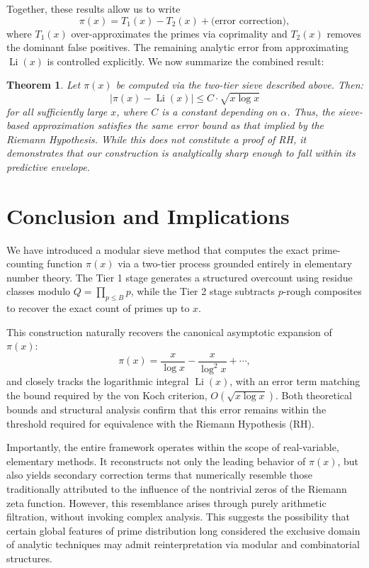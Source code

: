 \documentclass[11pt]{article}
\newtheorem{theorem}{Theorem}
\begin{document}
	\medskip
	Together, these results allow us to write
	\[
	\pi(x) = T_1(x) - T_2(x) + \text{(error correction)},
	\]
	where \( T_1(x) \) over-approximates the primes via coprimality and \( T_2(x) \) removes the dominant false positives. The remaining analytic error from approximating \( \operatorname{Li}(x) \) is controlled explicitly. We now summarize the combined result:
	
	\begin{theorem}
		Let \( \pi(x) \) be computed via the two-tier sieve described above. Then:
		\[
		\left| \pi(x) - \operatorname{Li}(x) \right| \leq C \cdot \sqrt{x \log x}
		\]
		for all sufficiently large \( x \), where \( C \) is a constant depending on \( \alpha \). Thus, the sieve-based approximation satisfies the same error bound as that implied by the Riemann Hypothesis. While this does not constitute a proof of RH, it demonstrates that our construction is analytically sharp enough to fall within its predictive envelope.
	\end{theorem}

	
	\section{Conclusion and Implications}
	
	We have introduced a modular sieve method that computes the exact prime-counting function $\pi(x)$ via a two-tier process grounded entirely in elementary number theory. The Tier 1 stage generates a structured overcount using residue classes modulo $Q = \prod_{p \leq B} p$, while the Tier 2 stage subtracts $p$-rough composites to recover the exact count of primes up to $x$.
	
	This construction naturally recovers the canonical asymptotic expansion of $\pi(x)$:
	\[
	\pi(x) = \frac{x}{\log x} - \frac{x}{\log^2 x} + \cdots,
	\]
	and closely tracks the logarithmic integral $\operatorname{Li}(x)$, with an error term matching the bound required by the von Koch criterion, $O(\sqrt{x \log x})$. Both theoretical bounds and structural analysis confirm that this error remains within the threshold required for equivalence with the Riemann Hypothesis (RH).
	
	Importantly, the entire framework operates within the scope of real-variable, elementary methods. It reconstructs not only the leading behavior of $\pi(x)$, but also yields secondary correction terms that numerically resemble those traditionally attributed to the influence of the nontrivial zeros of the Riemann zeta function. However, this resemblance arises through purely arithmetic filtration, without invoking complex analysis. This suggests the possibility that certain global features of prime distribution long considered the exclusive domain of analytic techniques may admit reinterpretation via modular and combinatorial structures.
	
\end{document}

